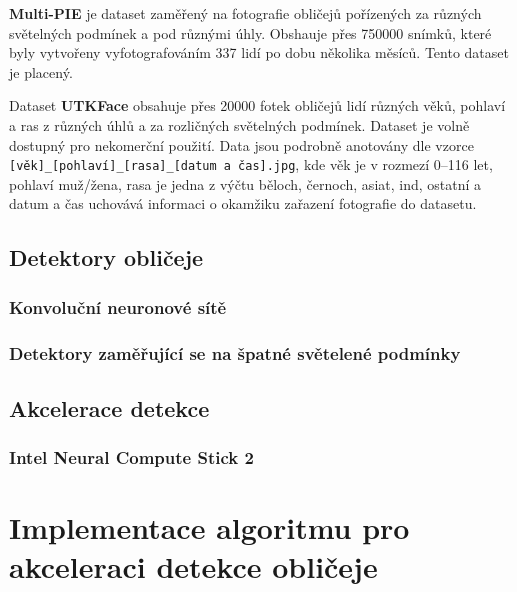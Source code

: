 \textbf{Multi-PIE} \cite{multipie} je dataset zaměřený na fotografie obličejů pořízených za různých světelných podmínek a pod různými úhly. Obshauje přes 750000 snímků, které byly vytvořeny vyfotografováním 337 lidí po dobu několika měsíců. Tento dataset je placený.

Dataset \textbf{UTKFace} \cite{utkface} obsahuje přes 20000 fotek obličejů lidí různých věků, pohlaví a ras z různých úhlů a za rozličných světelných podmínek. Dataset je volně dostupný pro nekomerční použití. Data jsou podrobně anotovány dle vzorce \texttt{[věk]\_[pohlaví]\_[rasa]\_[datum a čas].jpg}, kde věk je v rozmezí 0--116 let, pohlaví muž/žena, rasa je jedna z výčtu běloch, černoch, asiat, ind, ostatní a datum a čas uchovává informaci o okamžiku zařazení fotografie do datasetu.

\section{Detektory obličeje}
\label{sekce:NSdetektory}

\subsection*{Konvoluční neuronové sítě}

\subsection*{Detektory zaměřující se na špatné světelené podmínky}

\section{Akcelerace detekce}
\label{sekce:akcelerace}

\subsection*{Intel Neural Compute Stick 2}






\chapter{Implementace algoritmu pro akceleraci detekce obličeje}
\label{kapitola:implementace}


